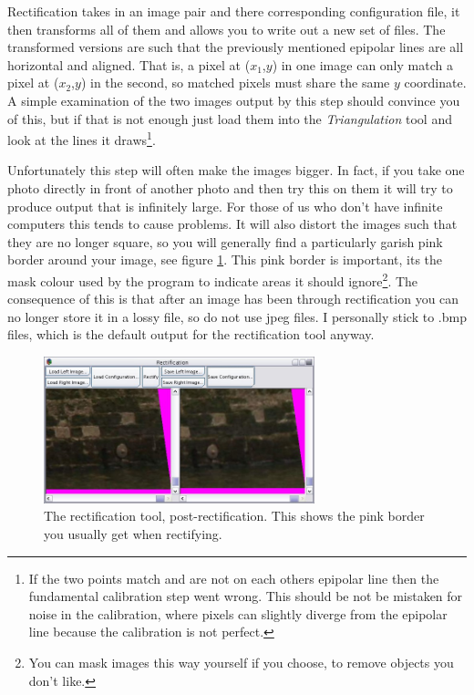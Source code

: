 \documentclass[10pt,a4paper,twoside]{article}
\begin{document}
Rectification takes in an image pair and there corresponding configuration file, it then transforms all of them and allows you to write out a new set of files. The transformed versions are such that the previously mentioned epipolar lines are all horizontal and aligned. That is, a pixel at ($x_1$,$y$) in one image can only match a pixel at ($x_2$,$y$) in the second, so matched pixels must share the same $y$ coordinate. A simple examination of the two images output by this step should convince you of this, but if that is not enough just load them into the \emph{Triangulation} tool and look at the lines it draws\footnote{If the two points match and are not on each others epipolar line then the fundamental calibration step went wrong. This should be not be mistaken for noise in the calibration, where pixels can slightly diverge from the epipolar line because the calibration is not perfect.}.

Unfortunately this step will often make the images bigger. In fact, if you take one photo directly in front of another photo and then try this on them it will try to produce output that is infinitely large. For those of us who don't have infinite computers this tends to cause problems. It will also distort the images such that they are no longer square, so you will generally find a particularly garish pink border around your image, see figure \ref{fig:rectification}. This pink border is important, its the mask colour used by the program to indicate areas it should ignore\footnote{You can mask images this way yourself if you choose, to remove objects you don't like.}. The consequence of this is that after an image has been through rectification you can no longer store it in a lossy file, so do not use jpeg files. I personally stick to .bmp files, which is the default output for the rectification tool anyway.

\begin{figure}
 \centering
 \includegraphics[width=0.7\textwidth]{screenshots/rectification}
 \caption{The rectification tool, post-rectification. This shows the pink border you usually get when rectifying.}
 \label{fig:rectification}
\end{figure}
\end{document}

